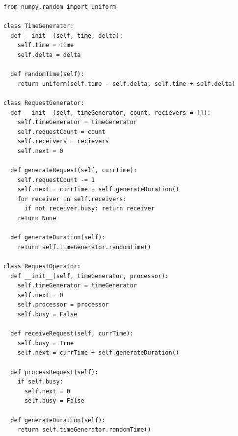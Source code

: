 \documentclass[12pt]{report}
\begin{document}
\begin{lstlisting}
from numpy.random import uniform

class TimeGenerator:
  def __init__(self, time, delta):
    self.time = time
    self.delta = delta

  def randomTime(self):
    return uniform(self.time - self.delta, self.time + self.delta)

class RequestGenerator:
  def __init__(self, timeGenerator, count, recievers = []):
    self.timeGenerator = timeGenerator
    self.requestCount = count
    self.receivers = recievers
    self.next = 0

  def generateRequest(self, currTime):
    self.requestCount -= 1
    self.next = currTime + self.generateDuration()
    for receiver in self.receivers:
      if not receiver.busy: return receiver
    return None

  def generateDuration(self):
    return self.timeGenerator.randomTime()

class RequestOperator:
  def __init__(self, timeGenerator, processor):
    self.timeGenerator = timeGenerator
    self.next = 0
    self.processor = processor
    self.busy = False

  def receiveRequest(self, currTime):
    self.busy = True
    self.next = currTime + self.generateDuration()

  def processRequest(self):
    if self.busy:
      self.next = 0
      self.busy = False

  def generateDuration(self):
    return self.timeGenerator.randomTime()
\end{lstlisting}
\clearpage
\end{document}
